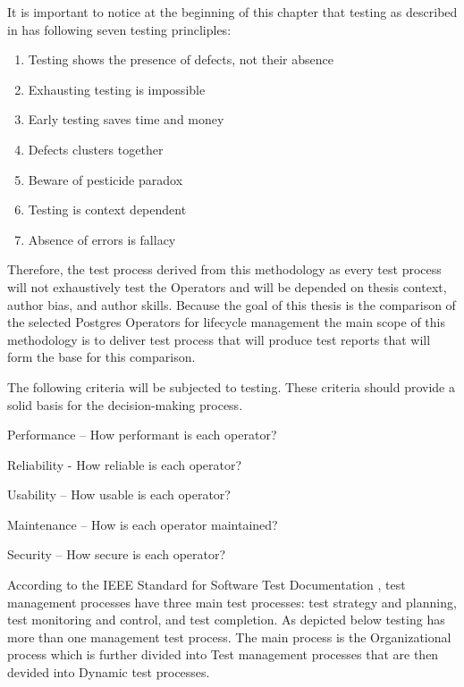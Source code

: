 It is important to notice at the beginning of this chapter that testing as described in \cite{FoundationOfSoftwareTesting} has following seven testing princliples:
\begin{enumerate}
  \item Testing shows the presence of defects, not their absence
  \item Exhausting testing is impossible
  \item Early testing saves time and money
  \item Defects clusters together
  \item Beware of pesticide paradox
  \item Testing is context dependent
  \item Absence of errors is fallacy
\end{enumerate}



Therefore, the test process derived from this methodology as every test process will not exhaustively test the Operators and will be depended on thesis context, author bias, and author skills. Because the goal of this thesis is the comparison of the selected Postgres Operators for lifecycle management the main scope of this methodology is to deliver test process that will produce test reports that will form the base for this comparison.

The following criteria will be subjected to testing. These criteria should provide a solid basis for the decision-making process.
\begin{criterias}
  \item	Performance – How performant is each operator?
  \item	Reliability - How reliable is each operator?
  \item	Usability – How usable is each operator?
  \item	Maintenance – How is each operator maintained?
  \item	Security – How secure is each operator?
\end{criterias}



According to the IEEE Standard for Software Test Documentation \cite{ieeeTestProcess}, test management processes have three main test processes: test strategy and planning, test monitoring and control, and test completion.
As depicted below testing has more than one management test process. The main process is the Organizational process which is further divided into Test management processes that are then devided into Dynamic test processes.

